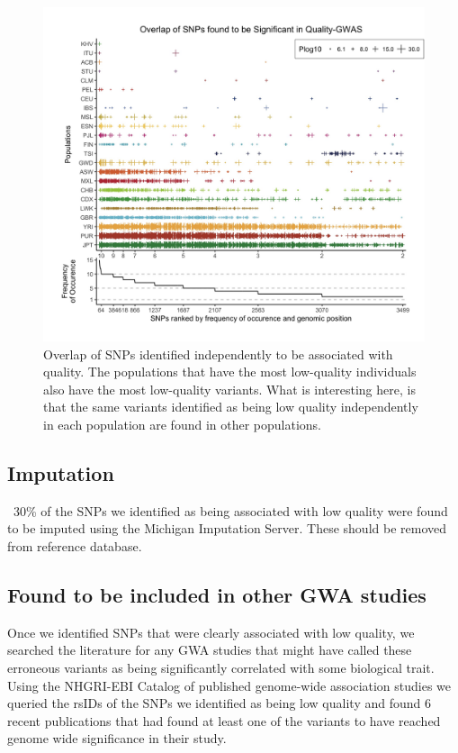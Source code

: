 \documentclass[9pt,lineno]{elife}
\begin{document}
\begin{figure}
\includegraphics[width=\hsize,keepaspectratio]{SNPOverlap6.jpg}

\caption{Overlap of SNPs identified independently to be associated with quality. The populations that have the most low-quality individuals also have the most low-quality variants. What is interesting here, is that the same variants identified as being low quality independently in each population are found in other populations. }
  \label{Figure3}
\end{figure}

	\subsection{Imputation}
~30\% of the SNPs we identified as being associated with low quality were found to be imputed using the Michigan Imputation Server. These should be removed from reference database.

	\subsection{Found to be included in other GWA studies}
Once we identified SNPs that were clearly associated with low quality, we searched the literature for any GWA studies that might have called these erroneous variants as being significantly correlated with some biological trait. 
Using the NHGRI-EBI Catalog of published genome-wide association studies we queried the rsIDs of the SNPs we identified as being low quality and found 6 recent publications that had found at least one of the variants to have reached genome wide significance in their study. 
\end{document}
